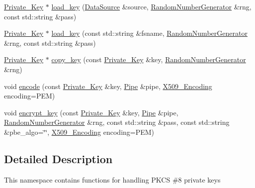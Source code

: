 \begin{DoxyCompactItemize}
\item 
\hyperlink{classBotan_1_1Private__Key}{Private\-\_\-\-Key} $\ast$ \hyperlink{namespaceBotan_1_1PKCS8_a1c7f4ce91440edc8b3ede4353455f377}{load\-\_\-key} (\hyperlink{classBotan_1_1DataSource}{Data\-Source} \&source, \hyperlink{classBotan_1_1RandomNumberGenerator}{Random\-Number\-Generator} \&rng, const std\-::string \&pass)
\item 
\hyperlink{classBotan_1_1Private__Key}{Private\-\_\-\-Key} $\ast$ \hyperlink{namespaceBotan_1_1PKCS8_a578d0aa9ab39f1ee4454e7a0dbdc4f8d}{load\-\_\-key} (const std\-::string \&fsname, \hyperlink{classBotan_1_1RandomNumberGenerator}{Random\-Number\-Generator} \&rng, const std\-::string \&pass)
\item 
\hyperlink{classBotan_1_1Private__Key}{Private\-\_\-\-Key} $\ast$ \hyperlink{namespaceBotan_1_1PKCS8_a77386a2d53f49239933bbef17dad52ff}{copy\-\_\-key} (const \hyperlink{classBotan_1_1Private__Key}{Private\-\_\-\-Key} \&key, \hyperlink{classBotan_1_1RandomNumberGenerator}{Random\-Number\-Generator} \&rng)
\item 
void \hyperlink{namespaceBotan_1_1PKCS8_abc883a2bead080767909d6c8cf236d9b}{encode} (const \hyperlink{classBotan_1_1Private__Key}{Private\-\_\-\-Key} \&key, \hyperlink{classBotan_1_1Pipe}{Pipe} \&pipe, \hyperlink{namespaceBotan_a53759b4ed1fb93549f307fcf68729d2f}{X509\-\_\-\-Encoding} encoding=P\-E\-M)
\item 
void \hyperlink{namespaceBotan_1_1PKCS8_aa32c311f3cbb893014e402700405b8db}{encrypt\-\_\-key} (const \hyperlink{classBotan_1_1Private__Key}{Private\-\_\-\-Key} \&key, \hyperlink{classBotan_1_1Pipe}{Pipe} \&pipe, \hyperlink{classBotan_1_1RandomNumberGenerator}{Random\-Number\-Generator} \&rng, const std\-::string \&pass, const std\-::string \&pbe\-\_\-algo=\char`\"{}\char`\"{}, \hyperlink{namespaceBotan_a53759b4ed1fb93549f307fcf68729d2f}{X509\-\_\-\-Encoding} encoding=P\-E\-M)
\end{DoxyCompactItemize}


\subsection{Detailed Description}
This namespace contains functions for handling P\-K\-C\-S \#8 private keys 

